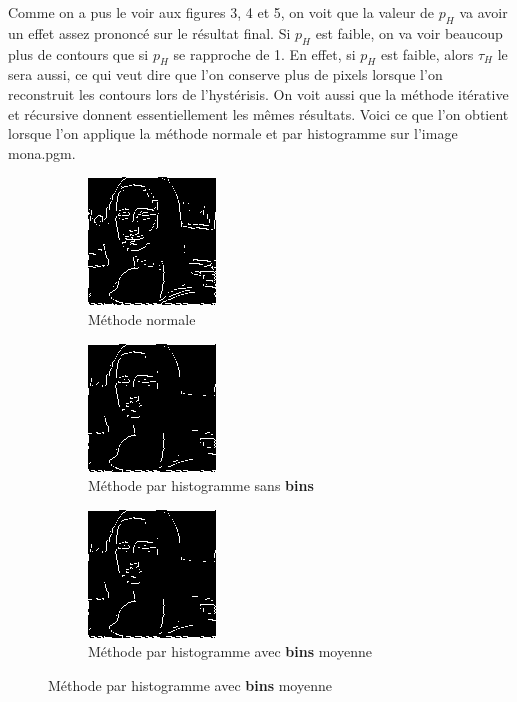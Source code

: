 \documentclass{article}
\begin{document}
Comme on a pus le voir aux figures 3, 4 et 5, on voit que la valeur de $p_H$ va avoir un effet assez prononcé sur le résultat final.
Si $p_H$ est faible, on va voir beaucoup plus de contours que si $p_H$ se rapproche de 1. En effet, si $p_H$ est faible, alors $\tau_H$ le sera aussi,
ce qui veut dire que l'on conserve plus de pixels lorsque l'on reconstruit les contours lors de l'hystérisis. On voit aussi que la méthode itérative et 
récursive donnent essentiellement les mêmes résultats. Voici ce que l'on obtient lorsque l'on applique la méthode normale et par histogramme sur l'image
mona.pgm.
\begin{figure}[H]
    \centering
    \begin{subfigure}[b]{0.45\linewidth}
        \centering
        \includegraphics[scale = 1]{TpIFT6150-2-mona_norm.png}
        \caption{Méthode normale}
    \end{subfigure}
    \begin{subfigure}[b]{0.45\linewidth}
        \centering
        \includegraphics[scale = 1]{TpIFT6150-2-mona_noBin.png}
        \caption{Méthode par histogramme sans \textbf{bins}}
    \end{subfigure}
    \vspace{1em}
    \begin{subfigure}[b]{0.45\linewidth}
        \centering
        \includegraphics[scale = 1]{TpIFT6150-2-mona_binAVG.png}
        \caption{Méthode par histogramme avec \textbf{bins} moyenne}

\end{subfigure}
\end{figure}
\end{document}
